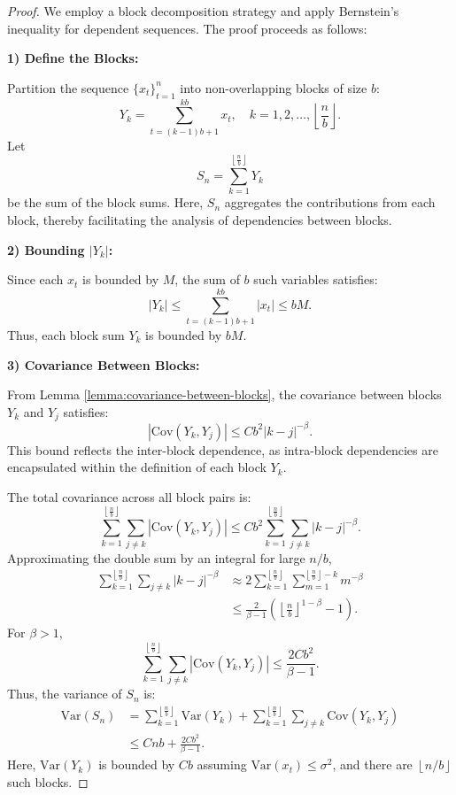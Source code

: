 \begin{proof}
We employ a block decomposition strategy and apply Bernstein's inequality \cite{vershynin2018high} for dependent sequences. The proof proceeds as follows:

\textbf{1) Define the Blocks:}

Partition the sequence \(\{x_t\}_{t=1}^n\) into non-overlapping blocks of size \(b\):
\[
Y_k = \sum_{t=(k-1)b + 1}^{kb} x_t, \quad k = 1, 2, \ldots, \left\lfloor \frac{n}{b} \right\rfloor.
\]
Let
\[
S_n = \sum_{k=1}^{\left\lfloor \frac{n}{b} \right\rfloor} Y_k
\]
be the sum of the block sums. Here, \(S_n\) aggregates the contributions from each block, thereby facilitating the analysis of dependencies between blocks.

\textbf{2) Bounding \(|Y_k|\):}

Since each \(x_t\) is bounded by \(M\), the sum of \(b\) such variables satisfies:
\[
|Y_k| \leq \sum_{t=(k-1)b + 1}^{kb} |x_t| \leq bM.
\]
Thus, each block sum \(Y_k\) is bounded by \(bM\).

\textbf{3) Covariance Between Blocks:}

From Lemma \ref{lemma:covariance-between-blocks}, the covariance between blocks \(Y_k\) and \(Y_j\) satisfies:
\[
|\text{Cov}(Y_k, Y_j)| \leq C b^2 |k - j|^{-\beta}.
\]
This bound reflects the inter-block dependence, as intra-block dependencies are encapsulated within the definition of each block \(Y_k\).

The total covariance across all block pairs is:
\[
\sum_{k=1}^{\left\lfloor \frac{n}{b} \right\rfloor} \sum_{j \neq k} |\text{Cov}(Y_k, Y_j)| \leq C b^2 \sum_{k=1}^{\left\lfloor \frac{n}{b} \right\rfloor} \sum_{j \neq k} |k - j|^{-\beta}.
\]
Approximating the double sum by an integral for large \(n/b\),
\begin{align*}
\sum_{k=1}^{\left\lfloor \frac{n}{b} \right\rfloor} \sum_{j \neq k} |k - j|^{-\beta} &\approx 2 \sum_{k=1}^{\left\lfloor \frac{n}{b} \right\rfloor} \sum_{m=1}^{\left\lfloor \frac{n}{b} \right\rfloor - k} m^{-\beta}\\
&\leq \frac{2}{\beta - 1} \left(\left\lfloor \frac{n}{b} \right\rfloor^{1 - \beta} - 1\right).
\end{align*}
For \(\beta > 1\),
\[
\sum_{k=1}^{\left\lfloor \frac{n}{b} \right\rfloor} \sum_{j \neq k} |\text{Cov}(Y_k, Y_j)| \leq \frac{2 C b^2}{\beta - 1}.
\]
Thus, the variance of \(S_n\) is:
\begin{align*}
\text{Var}(S_n) &= \sum_{k=1}^{\left\lfloor \frac{n}{b} \right\rfloor} \text{Var}(Y_k) + \sum_{k=1}^{\left\lfloor \frac{n}{b} \right\rfloor} \sum_{j \neq k} \text{Cov}(Y_k, Y_j)\\
&\leq C n b + \frac{2 C b^2}{\beta - 1}.
\end{align*}
Here, \(\text{Var}(Y_k)\) is bounded by \(C b\) assuming \(\text{Var}(x_t) \leq \sigma^2\), and there are \(\left\lfloor n/b \right\rfloor\) such blocks.


\end{proof}
